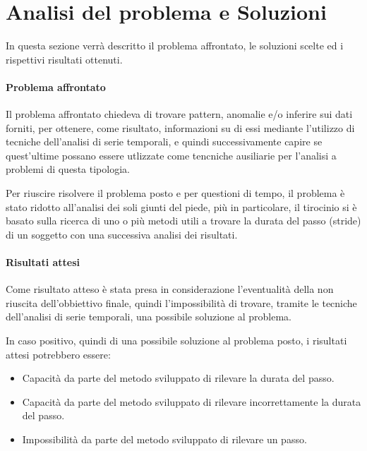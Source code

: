 \section{Analisi del problema e Soluzioni}
In questa sezione verrà descritto il problema affrontato, le soluzioni scelte ed i rispettivi
risultati ottenuti.

\paragraph{Problema affrontato}
Il problema affrontato chiedeva di trovare pattern, anomalie e/o inferire sui dati forniti, 
per ottenere, come risultato, informazioni su di essi mediante l'utilizzo di tecniche 
dell'analisi di serie temporali, e quindi successivamente capire se quest'ultime possano essere 
utlizzate come tencniche ausiliarie per l'analisi a problemi di questa tipologia.

Per riuscire risolvere il problema posto e per questioni di tempo, il problema è stato 
ridotto all'analisi dei soli giunti del piede, più in particolare,
il tirocinio si è basato sulla ricerca di uno o più metodi utili a trovare la durata del passo
(stride) di un soggetto con una successiva analisi dei risultati.



\paragraph{Risultati attesi}
\begin{sloppypar}
Come risultato atteso è stata presa in considerazione l'eventualità della non riuscita dell'obbiettivo finale,
quindi l'impossibilità di trovare, tramite le tecniche dell'analisi di serie temporali, una possibile soluzione
al problema.
\end{sloppypar}

In caso positivo, quindi di una possibile soluzione al problema posto, i risultati attesi potrebbero essere:
\begin{itemize}
    \setlength\itemsep{-0.5em}
    \item Capacità da parte del metodo sviluppato di rilevare la durata del passo.
    \item Capacità da parte del metodo sviluppato di rilevare incorrettamente la durata del passo.
    \item Impossibilità da parte del metodo sviluppato di rilevare un passo.
\end{itemize}


